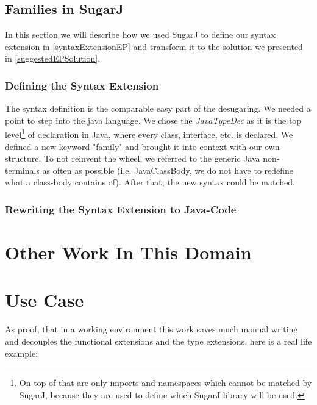 \documentclass{report}
\begin{document}
\section{Families in SugarJ}

In this section we will describe how we used SugarJ to define our syntax extension in \ref{syntaxExtensionEP} and transform it to the solution we presented in \ref{suggestedEPSolution}.

\subsection{Defining the Syntax Extension}
The syntax definition is the comparable easy part of the desugaring. We needed a point to step into the java language. We chose the \emph{JavaTypeDec} as it is the top level\footnote{On top of that are only imports and namespaces which cannot be matched by SugarJ, because they are used to define which SugarJ-library will be used.} of declaration in Java, where every class, interface, etc. is declared. We defined a new keyword "family" and brought it into context with our own structure. To not reinvent the wheel, we referred to the generic Java non-terminals as often as possible (i.e. JavaClassBody, we do not have to redefine what a class-body contains of). After that, the new syntax could be matched.

\subsection{Rewriting the Syntax Extension to Java-Code}


\chapter{Other Work In This Domain}


\chapter{Use Case}

As proof, that in a working environment this work saves much manual writing and decouples the functional extensions and the type extensions, here is a real life example:
\end{document}

